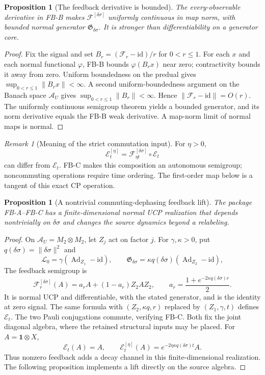 \documentclass[12pt]{article}
\newtheorem{proposition}[theorem]{Proposition}
\theoremstyle{definition}
\theoremstyle{remark}
\newtheorem{remark}[theorem]{Remark}
\begin{document}
\begin{proposition}[The feedback derivative is bounded]
\label{prop:boundedfeedback}
The every-observable derivative in FB-B makes
\(\mathscr F^{[\delta\sigma]}\) uniformly continuous in map norm,
with bounded normal generator \(\mathfrak G_{\delta\sigma}\).
It is stronger than differentiability on a generator core.
\end{proposition}
\begin{proof}
Fix the signal and set \(B_r=(\mathscr F_r-\mathrm{id})/r\)
for \(0<r\le1\). For each \(x\) and each normal functional
\(\varphi\), FB-B bounds \(\varphi(B_rx)\) near zero;
contractivity bounds it away from zero. Uniform boundedness on
the predual gives \(\sup_{0<r\le1}\|B_rx\|<\infty\).
A second uniform-boundedness argument on the Banach space
\(\mathcal A_U\) gives \(\sup_{0<r\le1}\|B_r\|<\infty\).
Hence \(\|\mathscr F_r-\mathrm{id}\|=O(r)\). The uniformly
continuous semigroup theorem yields a bounded generator, and its
norm derivative equals the FB-B weak derivative. A map-norm
limit of normal maps is normal.
\end{proof}

\begin{remark}[Meaning of the strict commutation input]
For \(\eta>0\),
\[
\mathcal E_t^{[\eta]}
=
\mathscr F_{\eta t}^{[\delta\sigma]}\circ \mathcal E_t
\]
can differ from \(\mathcal E_t\). FB-C makes this composition an
autonomous semigroup; noncommuting operations require time ordering.
The first-order map below is a tangent of this exact CP operation.
\end{remark}

\begin{proposition}[A nontrivial commuting-dephasing feedback lift]
\label{prop:fdlift}
The package FB-A--FB-C has a finite-dimensional normal UCP realization
that depends nontrivially on \(\delta\sigma\) and changes the source
dynamics beyond a relabeling.
\end{proposition}

\begin{proof}
On \(\mathcal A_U=M_2\otimes M_2\), let \(Z_j\) act on factor \(j\).
For \(\gamma,\kappa>0\), put \(q(\delta\sigma)=\|\delta\sigma\|^2\) and
\[
\mathcal L_0=\gamma(\operatorname{Ad}_{Z_1}-\mathrm{id}),
\qquad
\mathfrak G_{\delta\sigma}
=\kappa q(\delta\sigma)
(\operatorname{Ad}_{Z_2}-\mathrm{id}),
\]
The feedback semigroup is
\[
\mathscr F_r^{[\delta\sigma]}(A)
=a_r A+(1-a_r)Z_2AZ_2,
\qquad
a_r=\frac{1+e^{-2\kappa q(\delta\sigma)r}}{2}.
\]
It is normal UCP and differentiable, with the stated generator,
and is the identity at zero signal. The same formula with
\((Z_2,\kappa q,r)\) replaced by \((Z_1,\gamma,t)\) defines
\(\mathcal E_t\). The two Pauli conjugations commute, verifying FB-C.
Both fix the joint diagonal algebra, where the retained structural
inputs may be placed. For
\(A=\mathbf1\otimes X\),
\[
\mathcal E_t(A)=A,
\qquad
\mathcal E_t^{[\eta]}(A)
=e^{-2\eta\kappa q(\delta\sigma)t}A.
\]
Thus nonzero feedback adds a decay channel in this finite-dimensional
realization. The following proposition implements a lift directly on
the source algebra.
\end{proof}
\end{document}
